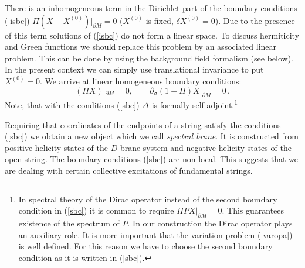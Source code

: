\documentclass[a4paper,12pt,twoside]{article}
\begin{document}
There is an inhomogeneous term in the Dirichlet
part of the boundary conditions (\ref{isbc}) $\Pi (X-X^{(0)})|_{\partial M}=0$
($X^{(0)}$ is fixed, $\delta X^{(0)}=0$). Due to the presence of
this term solutions of (\ref{isbc}) do not form a linear space.
To discuss hermiticity and Green functions we should
replace this problem by an associated linear problem. This can be
done by using the background field formalism (see below).
In the present context we can simply use translational
invariance to put $ X^{(0)}=0$. We arrive at linear homogeneous
boundary conditions:
\begin{equation}
(\Pi X)|_{\partial M}=0,\qquad 
\partial_\sigma (1-\Pi )X |_{\partial M}=0 \,.\label{sbc}
\end{equation}
Note, that with the conditions (\ref{sbc}) $\Delta$
is formally self-adjoint.\footnote{In spectral theory of the Dirac
operator instead of the second boundary
condition in (\ref{sbc}) it is common to require $\Pi P X|_{\partial M}=0$.
This guarantees existence of the spectrum of $P$. In our construction
the Dirac operator plays an auxiliary role. It is more important that
the variation problem (\ref{varopa}) is well defined. For this reason
we have to choose the second boundary condition as it is written
in (\ref{sbc}).}

Requiring that  coordinates of the endpoints of a 
string satisfy the conditions (\ref{sbc}) we
obtain a new object which we call {\it spectral brane}.
It is constructed from positive helicity states of
the $D$-brane system and negative helicity states
of the open string. The boundary conditions (\ref{sbc})
are non-local. This suggests that we are dealing
with certain collective excitations of fundamental
strings.
\end{document}
